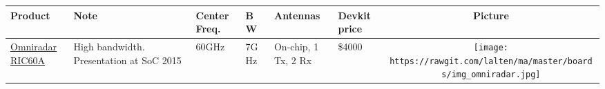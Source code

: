 
\begin{longtable}[]{@{}llllllc@{}}

\begin{minipage}[b]{0.09\columnwidth}\raggedright\strut
    Product
\strut\end{minipage} &
\begin{minipage}[b]{0.13\columnwidth}\raggedright\strut
    Note
\strut\end{minipage} &
\begin{minipage}[b]{0.09\columnwidth}\raggedright\strut
    Center Freq.
\strut\end{minipage} &
\begin{minipage}[b]{0.11\columnwidth}\raggedright\strut
    BW
\strut\end{minipage} &
\begin{minipage}[b]{0.10\columnwidth}\raggedright\strut
    Antennas
\strut\end{minipage} &
\begin{minipage}[b]{0.15\columnwidth}\raggedright\strut
    Devkit price
\strut\end{minipage} &
\begin{minipage}[b]{0.10\columnwidth}\centering\strut
    Picture
\strut\end{minipage}\tabularnewline
\midrule
\endhead



\begin{minipage}[t]{0.09\columnwidth}\raggedright\strut
	\href{https://www.omniradar.com/products/}{Omniradar RIC60A}
\strut\end{minipage} &
\begin{minipage}[t]{0.13\columnwidth}\raggedright\strut
High bandwidth. Presentation at SoC 2015\cite{Brouwer2015}
\strut\end{minipage} &
\begin{minipage}[t]{0.09\columnwidth}\raggedright\strut
60GHz
\strut\end{minipage} &
\begin{minipage}[t]{0.11\columnwidth}\raggedright\strut
7GHz
\strut\end{minipage} &
\begin{minipage}[t]{0.10\columnwidth}\raggedright\strut
On-chip, 1 Tx, 2 Rx
\strut\end{minipage} &
\begin{minipage}[t]{0.15\columnwidth}\raggedright\strut
\$4000
\strut\end{minipage} &
\begin{minipage}[t]{0.10\columnwidth}\centering\strut
\texttt{[image: https://rawgit.com/lalten/ma/master/boards/img\_omniradar.jpg]}
\strut\end{minipage}\tabularnewline


\end{longtable}

